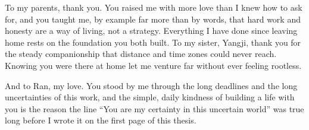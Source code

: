To my parents, thank you.
You raised me with more love than I knew how to ask for, and you taught me, by example far more than by words, that hard work and honesty are a way of living, not a strategy.
Everything I have done since leaving home rests on the foundation you both built.
To my sister, Yangji, thank you for the steady companionship that distance and time zones could never reach.
Knowing you were there at home let me venture far without ever feeling rootless.

And to Ran, my love.
You stood by me through the long deadlines and the long uncertainties of this work, and the simple, daily kindness of building a life with you is the reason the line ``You are my certainty in this uncertain world'' was true long before I wrote it on the first page of this thesis.

